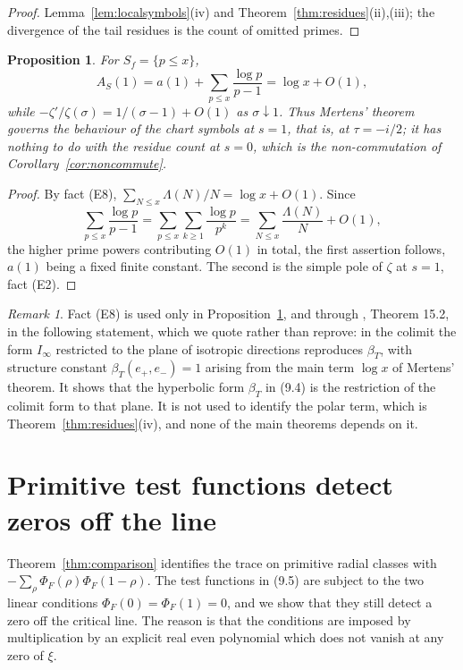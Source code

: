 \documentclass[11pt]{amsart}
\newtheorem{proposition}[theorem]{Proposition}
\theoremstyle{definition}
\theoremstyle{remark}
\newtheorem{remark}[theorem]{Remark}
\begin{document}
\begin{proof}
Lemma~\ref{lem:localsymbols}(iv) and
Theorem~\ref{thm:residues}(ii),(iii); the divergence of the tail residues is
the count of omitted primes.
\end{proof}

\begin{proposition}
\label{prop:mertens}
For $S_f=\{p\le x\}$,
\[
  A_S(1)=a(1)+\sum_{p\le x}\frac{\log p}{p-1}=\log x+O(1),
\]
while $-\zeta'/\zeta(\sigma)=1/(\sigma-1)+O(1)$ as $\sigma\downarrow1$.  Thus
Mertens' theorem governs the behaviour of the chart symbols at $s=1$, that is,
at $\tau=-i/2$; it has nothing to do with the residue count at $s=0$, which is
the non-commutation of Corollary~\emph{\ref{cor:noncommute}}.
\end{proposition}

\begin{proof}
By fact (E8), $\sum_{N\le x}\Lambda(N)/N=\log x+O(1)$.  Since
\[
  \sum_{p\le x}\frac{\log p}{p-1}=\sum_{p\le x}\sum_{k\ge1}\frac{\log p}{p^k}
  =\sum_{N\le x}\frac{\Lambda(N)}N+O(1),
\]
the higher prime powers contributing $O(1)$ in total, the first assertion
follows, $a(1)$ being a fixed finite constant.  The second is the simple pole
of $\zeta$ at $s=1$, fact (E2).
\end{proof}

\begin{remark}
\label{rem:mertens-scope}
Fact (E8) is used only in Proposition~\ref{prop:mertens}, and through
\cite{P43}, Theorem 15.2, in the following statement, which we quote rather
than reprove: in the colimit the form $I_\infty$ restricted to the plane of
isotropic directions reproduces $\beta_T$, with structure constant
$\beta_T(e_+,e_-)=1$ arising from the main term $\log x$ of Mertens' theorem.
It shows that the hyperbolic form $\beta_T$ in (9.4) is the restriction of the
colimit form to that plane.  It is not used to identify the polar term, which
is Theorem~\ref{thm:residues}(iv), and none of the main theorems depends on
it.
\end{remark}

\section{Primitive test functions detect zeros off the line}
\label{sec:sufficiency}

Theorem~\ref{thm:comparison} identifies the trace on primitive radial classes
with $-\sum_\rho\Phi_F(\rho)\Phi_F(1-\rho)$.  The test functions in (9.5) are
subject to the two linear conditions $\Phi_F(0)=\Phi_F(1)=0$, and we show that
they still detect a zero off the critical line.  The reason is that the
conditions are imposed by multiplication by an explicit real even polynomial
which does not vanish at any zero of $\xi$.
\end{document}
